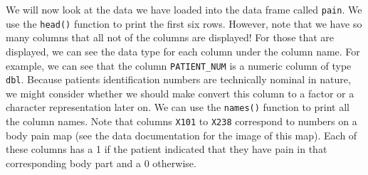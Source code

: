 \documentclass[
  letterpaper,
]{krantz}
\begin{document}
We will now look at the data we have loaded into the data frame called
\texttt{pain}. We use the \texttt{head()} function to print the first
six rows. However, note that we have so many columns that all not of the
columns are displayed! For those that are displayed, we can see the data
type for each column under the column name. For example, we can see that
the column \texttt{PATIENT\_NUM} is a numeric column of type
\texttt{dbl}. Because patients identification numbers are technically
nominal in nature, we might consider whether we should make convert this
column to a factor or a character representation later on. We can use
the \texttt{names()} function to print all the column names. Note that
columns \texttt{X101} to \texttt{X238} correspond to numbers on a body
pain map (see the data documentation for the image of this map). Each of
these columns has a 1 if the patient indicated that they have pain in
that corresponding body part and a 0 otherwise.
\end{document}
